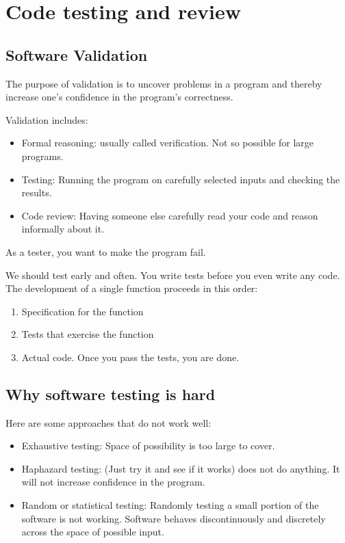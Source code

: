 \documentclass[letterpaper,12pt]{article}
\begin{document}
\section{Code testing and review}

\subsection{Software Validation}
The purpose of validation is to uncover problems in a program and thereby
increase one's confidence in the program's correctness.

Validation includes:
\begin{itemize}
      \item Formal reasoning: usually called verification. Not so possible for large
            programs.
      \item Testing: Running the program on carefully selected inputs and checking the
            results.
      \item Code review: Having someone else carefully read your code and reason informally
            about it.
\end{itemize}

As a tester, you want to make the program fail.

We should test early and often. You write tests before you even write any code.
The development of a single function proceeds in this order:
\begin{enumerate}
      \item Specification for the function
      \item Tests that exercise the function
      \item Actual code. Once you pass the tests, you are done.
\end{enumerate}

\subsection{Why software testing is hard}
Here are some approaches that do not work well:
\begin{itemize}
      \item Exhaustive testing: Space of possibility is too large to cover.
      \item Haphazard testing: (Just try it and see if it works) does not do anything. It
            will not increase confidence in the program.
      \item Random or statistical testing: Randomly testing a small portion of the software is
            not working. Software behaves discontinuously and discretely across the space
            of possible input.
\end{itemize}
\end{document}
